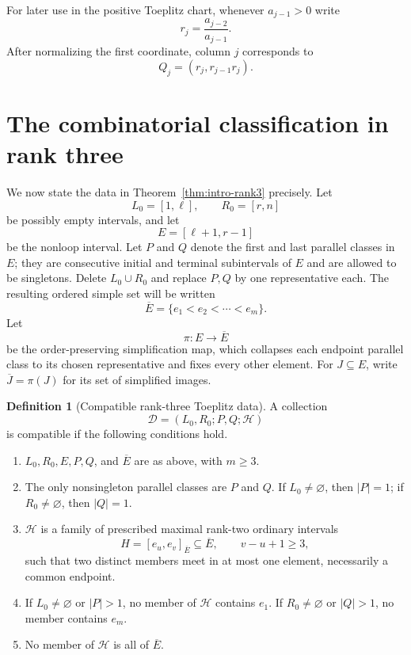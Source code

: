 \documentclass{amsart}
\numberwithin{equation}{section}
\theoremstyle{definition}
\newtheorem{definition}[theorem]{Definition}
\theoremstyle{remark}
\begin{document}
For later use in the positive Toeplitz chart, whenever $a_{j-1}>0$ write
\begin{equation}\label{eq:rdef}
 r_j=\frac{a_{j-2}}{a_{j-1}}.
\end{equation}
After normalizing the first coordinate, column $j$ corresponds to
\begin{equation}\label{eq:rpoint}
 Q_j=(r_j,r_{j-1}r_j).
\end{equation}

\section{The combinatorial classification in rank three}

We now state the data in Theorem~\ref{thm:intro-rank3} precisely.  Let
\begin{equation}\label{eq:loops}
 L_0=[1,\ell],
 \qquad
 R_0=[r,n]
\end{equation}
be possibly empty intervals, and let
\begin{equation}\label{eq:nonloops}
 E=[\ell+1,r-1]
\end{equation}
be the nonloop interval.  Let $P$ and $Q$ denote the first and last parallel classes in $E$; they are consecutive initial and terminal subintervals of $E$ and are allowed to be singletons.  Delete $L_0\cup R_0$ and replace $P,Q$ by one representative each.  The resulting ordered simple set will be written
\begin{equation}\label{eq:simpleE}
 \overline E=\{e_1<e_2<\cdots<e_m\}.
\end{equation}
Let
\[
 \pi:E\longrightarrow\overline E
\]
be the order-preserving simplification map, which collapses each endpoint parallel class to its chosen representative and fixes every other element.  For $J\subseteq E$, write $\overline J=\pi(J)$ for its set of simplified images.

\begin{definition}[Compatible rank-three Toeplitz data]\label{def:compatible}
A collection
\[
 \mathcal D=(L_0,R_0;P,Q;\mathcal H)
\]
is compatible if the following conditions hold.
\begin{enumerate}
\item $L_0,R_0,E,P,Q$, and $\overline E$ are as above, with $m\ge3$.
\item The only nonsingleton parallel classes are $P$ and $Q$.  If $L_0\ne\varnothing$, then $|P|=1$; if $R_0\ne\varnothing$, then $|Q|=1$.
\item $\mathcal H$ is a family of prescribed maximal rank-two ordinary intervals
\[
 H=[e_u,e_v]_{\overline E}\subseteq\overline E,
 \qquad v-u+1\ge3,
\]
such that two distinct members meet in at most one element, necessarily a common endpoint.
\item If $L_0\ne\varnothing$ or $|P|>1$, no member of $\mathcal H$ contains $e_1$.  If $R_0\ne\varnothing$ or $|Q|>1$, no member contains $e_m$.
\item No member of $\mathcal H$ is all of $\overline E$.
\end{enumerate}
\end{definition}
\end{document}
